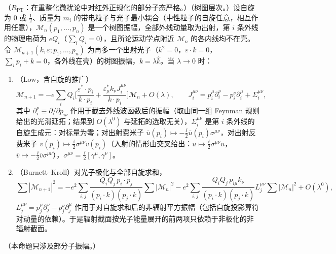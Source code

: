 \begin{proposition}\label{prop:power-next-to-soft}
（$R_{\mathrm{PT}}$：在重整化微扰论中对红外正规化的部分子态严格。）（树图层次。）设自旋为 0 或 $\frac12$、质量为 $m_i$ 的带电粒子与光子最小耦合（中性粒子的自旋任意，相互作用任意），$\mathcal M_n(p_1,\dots,p_n)$ 是一个树图振幅，全部外线动量取为出射，第 $i$ 条外线的物理电荷为 $eQ_i$（$\sum_iQ_i=0$），且所论运动学点附近 $\mathcal M_n$ 的各内线均不在壳。令 $\mathcal M_{n+1}(k,\varepsilon;p_1,\dots,p_n)$ 为再多一个出射光子（$k^2=0$，$\varepsilon\cdot k=0$，$\sum_ip_i+k=0$，各外线在壳）的树图振幅，$k=\lambda\hat k$。当 $\lambda\to0$ 时：
\begin{enumerate}[label=(\alph*),leftmargin=2em,itemsep=1pt,topsep=2pt]
\item（Low，含自旋的推广）
\begin{equation}\label{eq:power-lbk}
\mathcal M_{n+1}=-e\sum_iQ_i\Big[\frac{\varepsilon^*\!\cdot p_i}{k\cdot p_i}+\frac{\varepsilon^*_\mu k_\nu J_i^{\mu\nu}}{k\cdot p_i}\Big]\mathcal M_n+O(\lambda),\qquad
J_i^{\mu\nu}=p_i^\mu\partial_i^\nu-p_i^\nu\partial_i^\mu+\Sigma_i^{\mu\nu},
\end{equation}
其中 $\partial_i^\nu\equiv\partial/\partial p_{i\nu}$ 作用于截去外线波函数后的振幅（取由同一组 Feynman 规则给出的光滑延拓；结果到 $O(\lambda^0)$ 与延拓的选取无关），$\Sigma_i^{\mu\nu}$ 是第 $i$ 条外线的自旋生成元：对标量为零；对出射费米子 $\bar u(p_i)\mapsto-\frac{\ii}{2}\bar u(p_i)\sigma^{\mu\nu}$，对出射反费米子 $v(p_i)\mapsto\frac{\ii}{2}\sigma^{\mu\nu}v(p_i)$（入射的情形由交叉给出：$u\mapsto\frac{\ii}{2}\sigma^{\mu\nu}u$，$\bar v\mapsto-\frac{\ii}{2}\bar v\sigma^{\mu\nu}$），$\sigma^{\mu\nu}=\frac{\ii}{2}[\gamma^\mu,\gamma^\nu]$。
\item（Burnett--Kroll）对光子极化与全部自旋求和，
\begin{equation}\label{eq:power-bk}
\sum|\mathcal M_{n+1}|^2=-e^2\sum_{i,j}\frac{Q_iQ_j\,p_i\cdot p_j}{(p_i\cdot k)(p_j\cdot k)}\sum|\mathcal M_n|^2
-e^2\sum_{i,j}\frac{Q_iQ_j\,p_{i\mu}k_\nu}{(p_i\cdot k)(p_j\cdot k)}L_j^{\mu\nu}\sum|\mathcal M_n|^2+O(\lambda^0),
\end{equation}
$L_j^{\mu\nu}=p_j^\mu\partial_j^\nu-p_j^\nu\partial_j^\mu$ 作用于对自旋求和后的非辐射平方振幅（包括自旋投影算符对动量的依赖）。于是辐射截面按光子能量展开的前两项只依赖于非极化的非辐射截面。
\end{enumerate}
（本命题只涉及部分子振幅。）
\end{proposition}

